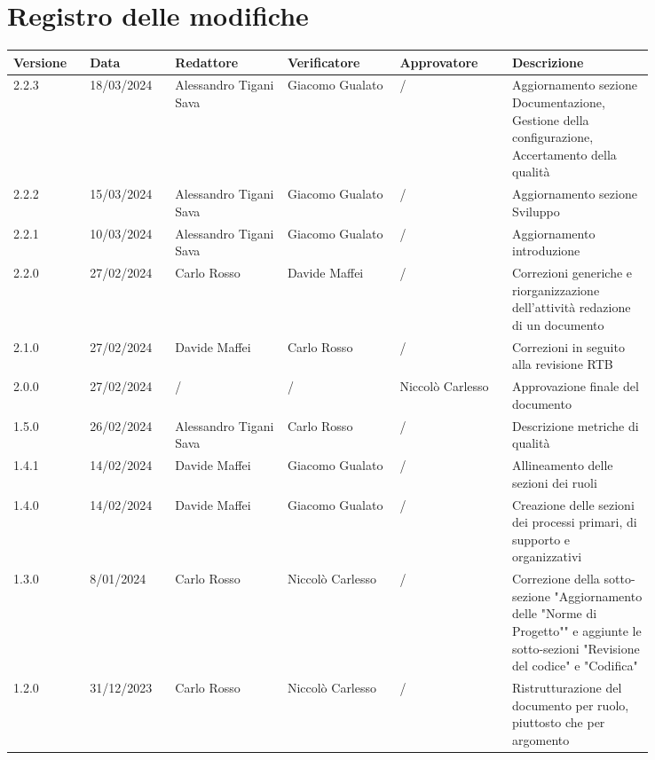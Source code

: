 \section*{Registro delle modifiche}
 {
  \scriptsize
  \begin{longtable}{p{0.10\linewidth}p{0.10\linewidth}p{0.15\linewidth}p{0.15\linewidth}p{0.15\linewidth}p{0.19\linewidth}}
	  \textbf{Versione} & \textbf{Data} & \textbf{Redattore}     & \textbf{Verificatore} & \textbf{Approvatore} & \textbf{Descrizione}	\\
	  \toprule
	  2.2.3	& 18/03/2024    & Alessandro Tigani Sava & Giacomo Gualato	& /					& Aggiornamento sezione Documentazione, Gestione della configurazione, Accertamento della qualità	\\
	  \hline
	  2.2.2	& 15/03/2024    & Alessandro Tigani Sava & Giacomo Gualato	& /					& Aggiornamento sezione Sviluppo	\\
	  \hline
	  2.2.1	& 10/03/2024    & Alessandro Tigani Sava & Giacomo Gualato	& /					& Aggiornamento introduzione	\\
	  \hline
	  2.2.0	& 27/02/2024    & Carlo Rosso            & Davide Maffei	& /					& Correzioni generiche e riorganizzazione dell'attività redazione di un documento	\\
	  \hline
	  2.1.0	& 27/02/2024    & Davide Maffei          & Carlo Rosso		& /					& Correzioni in seguito alla revisione RTB                                                                                                 \\
	  \hline
	  2.0.0	& 27/02/2024    & /                      & /				& Niccolò Carlesso	& Approvazione finale del documento	\\
	  \hline
	  1.5.0	& 26/02/2024    & Alessandro Tigani Sava & Carlo Rosso		& /					& Descrizione metriche di qualità	\\
	  \hline
	  1.4.1	& 14/02/2024    & Davide Maffei          & Giacomo Gualato	& /					& Allineamento delle sezioni dei ruoli	\\
	  \hline
	  1.4.0	& 14/02/2024    & Davide Maffei          & Giacomo Gualato	& /					& Creazione delle sezioni dei processi primari, di supporto e organizzativi	\\
	  \hline
	  1.3.0	& 8/01/2024     & Carlo Rosso            & Niccolò Carlesso	& /					& Correzione della sotto-sezione "Aggiornamento delle "Norme di Progetto"" e aggiunte le sotto-sezioni "Revisione del codice" e "Codifica" \\
	  \hline
	  1.2.0	& 31/12/2023    & Carlo Rosso            & Niccolò Carlesso	& /					& Ristrutturazione del documento per ruolo, piuttosto che per argomento	\\

\end{longtable}}
